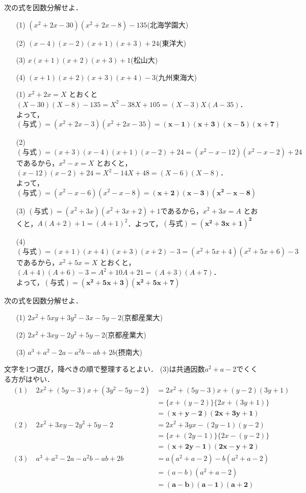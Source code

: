 \documentclass[a4paper,11pt]{ltjsarticle}
\begin{document}
\begin{toi}
次の式を因数分解せよ．
\begin{itemize}
    \item [(1)]$(x^2+2x-30)(x^2+2x-8)-135$\hfill(北海学園大)
    \item [(2)]$(x-4)(x-2)(x+1)(x+3)+24$\hfill(東洋大)
    \item [(3)]$x(x+1)(x+2)(x+3)+1$\hfill(松山大)
    \item [(4)]$(x+1)(x+2)(x+3)(x+4)-3$\hfill(九州東海大)
\end{itemize}
\end{toi}
\ans 
\begin{itemize}
      \item[(1)] $x^2+2x=X$ とおくと$(X-30)(X-8)-135 = X^2-38X+105 = (X-3)X(A-35)$．\\
よって，$(与式)=(x^2+2x-3)(x^2+2x-35) = \boldsymbol{(x-1)(x+3)(x-5)(x+7)}$\\
    \item[(2)] $(与式)=(x+3)(x-4)(x+1)(x-2)+24=(x^2-x-12)(x^2-x-2)+24$であるから，$x^2-x=X$ とおくと，$(x-12)(x-2)+24 = X^2-14X+48=(X-6)(X-8)$．\\
    よって，$(与式)=(x^2-x-6)(x^2-x-8) = \boldsymbol{(x+2)(x-3)(x^2-x-8)}$\\
    \item [(3)]$(与式)=(x^2+3x)(x^2+3x+2)+1$であるから，$x^2+3x=A$ とおくと，$A(A+2)+1 = (A+1)^2$．よって，$(与式)=\boldsymbol{(x^2+3x+1)^2}$\\
    \item [(4)]$(与式)=(x+1)(x+4)(x+3)(x+2)-3=(x^2+5x+4)(x^2+5x+6)-3$であるから，$x^2+5x=X$ とおくと，$(A+4)(A+6)-3 = A^2+10A+21=(A+3)(A+7)$．\\
    よって，$(与式)=\boldsymbol{(x^2+5x+3)(x^2+5x+7)}$
\end{itemize}
\begin{toi}
次の式を因数分解せよ．
\begin{itemize}
    \item [(1)]$2x^2+5xy+3y^2-3x-5y-2$\hfill(京都産業大)
    \item [(2)]$2x^2+3xy-2y^2+5y-2$\hfill(京都産業大)
        \item [(3)]$a^3+a^2-2a-a^2b-ab+2b$\hfill(摂南大)
\end{itemize}
\end{toi}
\ans 文字を1つ選び，降べきの順で整理するとよい． (3)は共通因数$a^2+a-2$でくくる方がはやい．
\begin{align*}
    &(1)~& 2x^2+(5y-3)x+(3y^2-5y-2) &= 2x^2+(5y-3)x+(y-2)(3y+1)\\
     &&&=\{x+(y-2)\}\{2x+(3y+1)\} \\
     &&&= \boldsymbol{(x+y-2)(2x+3y+1)}\\
        &(2)~& 2x^2+3xy-2y^2+5y-2 &= 2x^2+3yx-(2y-1)(y-2)\\
     &&&=\{x+(2y-1)\}\{2x-(y-2)\}\\
     &&&= \boldsymbol{(x+2y-1)(2x-y+2)}\\
        &(3)~& a^3+a^2-2a-a^2b-ab+2b&=a(a^2+a-2)-b(a^2+a-2) \\
        &&& = (a-b)(a^2+a-2) \\
        &&&= \boldsymbol{(a-b)(a-1)(a+2)}
     \end{align*}
\end{document}
